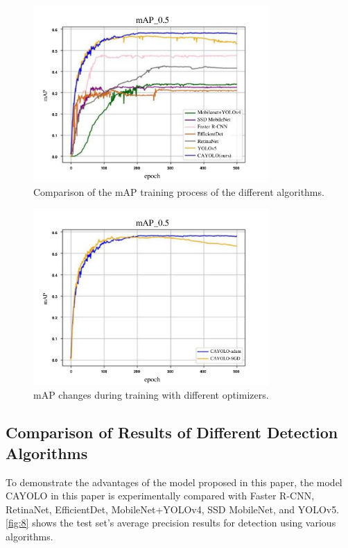 \documentclass[sensors,article,submit,moreauthors]{Definitions/mdpi}
\begin{document}
    \begin{figure}[H]
        \includegraphics[width=0.8\textwidth]{./images/figure6}
        \caption{Comparison of the mAP training process of the different algorithms.\label{fig:6}}
    \end{figure}
    \unskip
    \begin{figure}[H]
        \includegraphics[width=0.8\textwidth]{./images/figure7}
        \caption{mAP changes during training with different optimizers.\label{fig:7}}
    \end{figure}

    \subsection{Comparison of Results of Different Detection Algorithms}

    To demonstrate the advantages of the model proposed in this paper, the model CAYOLO in this paper is experimentally compared with Faster R-CNN, RetinaNet, EfficientDet, MobileNet+YOLOv4, SSD MobileNet, and YOLOv5. \autoref{fig:8} shows the test set's average precision results for detection using various algorithms.
\end{document}
